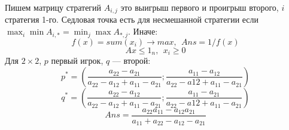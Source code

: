 Пишем матрицу стратегий $A_{i,j}$ это выигрыш первого и проигрыш второго, $i$ стратегия 1-го.
Седловая точка есть для несмешанной стратегии если $\max_{i}\min A_{i,*} = \min_{j}\max A_{*,j}$.
Иначе:
$$
f(x) = sum(x_i) \rightarrow max,\ \ Ans = 1/f(x)
$$
$$
Ax \leq 1_n,\ \ x_i \geq 0
$$
Для $2\times 2$, $p$ первый игрок, $q$ --- второй:
$$
p^* = \left(\frac{a_{22} - a_{21}}{a_{22} - a_{12} + a_{11} - a_{21}}; \frac{a_{11} - a_{12}}{a_{22} - a{12} + a_{11} - a_{21}} \right)
$$
$$
q^* = \left(\frac{a_{22} - a_{12}}{a_{22} - a_{12} + a_{11} - a_{21}}; \frac{a_{11} - a_{21}}{a_{22} - a{12} + a_{11} - a_{21}} \right)
$$
$$
Ans = \frac{a_{22}a_{11} - a_{12}a_{21}}{a_{11} + a_{22} - a_{12} - a_{21}}
$$

